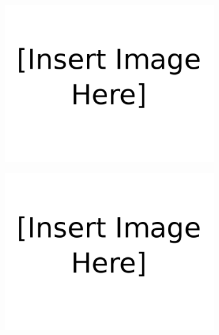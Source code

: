 \begin{figure}[H]
\begin{subfigure}{0.33\textwidth}
    \includegraphics[width=\linewidth]{figures/Insert_image_here.png}
    \caption{}\label{fig:1.1}
\end{subfigure}\hfill
\begin{subfigure}{0.33\textwidth}
    \includegraphics[width=\linewidth]{figures/Insert_image_here.png}
    \caption{}\label{fig:1.2}
\end{subfigure}\hfill
\begin{subfigure}{0.33\textwidth}

\end{subfigure}
\end{figure}
